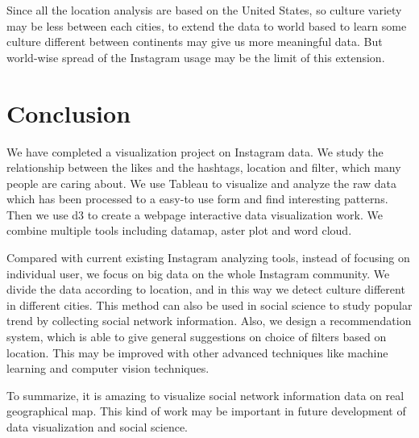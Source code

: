\documentclass[conference]{acmsiggraph}
\begin{document}
Since all the location analysis are based on the United States, so culture variety may be less between each cities, to extend the data to world based to learn some culture different between continents may give us more meaningful data. But world-wise spread of the Instagram usage may be the limit of this extension.

\section{Conclusion}

We have completed a visualization project on Instagram data. We study the relationship between the likes and the hashtags, location and filter, which many people are caring about. We use Tableau to visualize and analyze the raw data which has been processed to a easy-to use form and find interesting patterns. Then we use d3 to create a webpage interactive data visualization work. We combine multiple tools including datamap, aster plot and word cloud.

Compared with current existing Instagram analyzing tools, instead of focusing on individual user, we focus on big data on the whole Instagram community. We divide the data according to location, and in this way we detect culture different in different cities. This method can also be used in social science to study popular trend by collecting social network information. Also, we design a recommendation system, which is able to give general suggestions on choice of filters based on location. This may be improved with other advanced techniques like machine learning and computer vision techniques.

To summarize, it is amazing to visualize social network information data on real geographical map. This kind of work may be important in future development of data visualization and social science.	
\end{document}
